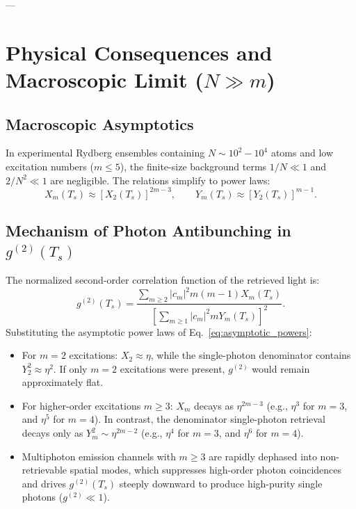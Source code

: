\documentclass[11pt,a4paper]{article}
\begin{document}
---

\section{Physical Consequences and Macroscopic Limit ($N \gg m$)}

\subsection{Macroscopic Asymptotics}
In experimental Rydberg ensembles containing $N \sim 10^2 - 10^4$ atoms and low excitation numbers ($m \le 5$), the finite-size background terms $1/N \ll 1$ and $2/N^2 \ll 1$ are negligible. The relations simplify to power laws:
\begin{equation}
    X_m(T_s) \approx \left[ X_2(T_s) \right]^{2m - 3}, \qquad Y_m(T_s) \approx \left[ Y_2(T_s) \right]^{m - 1}.
    \label{eq:asymptotic_powers}
\end{equation}

\subsection{Mechanism of Photon Antibunching in $g^{(2)}(T_s)$}
The normalized second-order correlation function of the retrieved light is:
\begin{equation}
    g^{(2)}(T_s) = \frac{\sum_{m \ge 2} |c_m|^2 m(m - 1) X_m(T_s)}{\left[ \sum_{m \ge 1} |c_m|^2 m Y_m(T_s) \right]^2}.
    \label{eq:g2_formula}
\end{equation}
Substituting the asymptotic power laws of Eq.~\eqref{eq:asymptotic_powers}:
\begin{itemize}
    \item For $m = 2$ excitations: $X_2 \approx \eta$, while the single-photon denominator contains $Y_2^2 \approx \eta^2$. If only $m = 2$ excitations were present, $g^{(2)}$ would remain approximately flat.
    \item For higher-order excitations $m \ge 3$: $X_m$ decays as $\eta^{2m - 3}$ (e.g., $\eta^3$ for $m = 3$, and $\eta^5$ for $m = 4$). In contrast, the denominator single-photon retrieval decays only as $Y_m^2 \sim \eta^{2m - 2}$ (e.g., $\eta^4$ for $m = 3$, and $\eta^6$ for $m = 4$).
    \item Multiphoton emission channels with $m \ge 3$ are rapidly dephased into non-retrievable spatial modes, which suppresses high-order photon coincidences and drives $g^{(2)}(T_s)$ steeply downward to produce high-purity single photons ($g^{(2)} \ll 1$).
\end{itemize}
\end{document}
